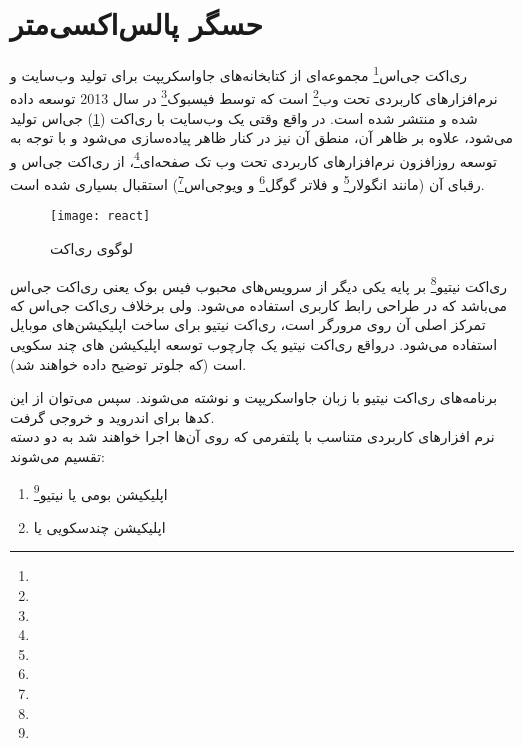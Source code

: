 \section{حسگر پالس‌اکسی‌متر}

ری‌اکت جی‌اس\footnote{} مجموعه‌ای از کتابخانه‌های جاواسکریپت برای تولید وب‌سایت و نرم‌افزارهای کاربردی تحت وب\footnote{} است که توسط فیسبوک\footnote{} در سال 2013 توسعه داده شده و منتشر شده است. در واقع وقتی یک وب‌سایت با ری‌اکت (\cref{fig:react}) جی‌اس تولید می‌شود، علاوه بر ظاهر آن، منطق آن نیز در کنار ظاهر پیاده‌سازی می‌شود و با توجه به توسعه روزافزون نرم‌افزارهای کاربردی تحت وب تک صفحه‌ای\footnote{}، از ری‌اکت جی‌اس و رقبای آن (مانند انگولار\footnote{} و فلاتر گوگل\footnote{} و ویوجی‌اس\footnote{}) استقبال بسیاری شده است\cite{wiki:react}.

\begin{figure}[H]
	\centering
	\texttt{[image: react]}
	\caption{لوگوی ری‌اکت}
	\label{fig:react}
\end{figure}


ری‌اکت نیتیو\footnote{} بر پایه یکی دیگر از سرویس‌های محبوب فیس بوک یعنی ری‌اکت جی‌اس می‌باشد که در طراحی رابط کاربری استفاده می‌شود. ولی برخلاف ری‌اکت جی‌اس که تمرکز اصلی آن روی مرورگر است، ری‌اکت نیتیو برای ساخت اپلیکیشن‌های موبایل استفاده می‌شود\cite{wiki:react}.
درواقع  ری‌اکت نیتیو یک چارچوب توسعه اپلیکیشن های چند سکویی است (که جلوتر توضیح داده خواهند شد).

برنامه‌های ری‌اکت نیتیو با زبان جاواسکریپت و  نوشته می‌شوند. سپس می‌توان از این کدها برای اندروید و  خروجی گرفت.\\

نرم افزارهای کاربردی متناسب با پلتفرمی که روی آن‌ها اجرا خواهند شد به دو دسته تقسیم می‌شوند:
\begin{enumerate}
	\item اپلیکیشن بومی یا نیتیو\footnote{}
	\item اپلیکیشن چندسکویی یا 
\end{enumerate}



